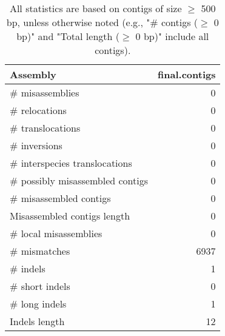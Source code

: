 \documentclass[12pt,a4paper]{article}
\begin{document}
\begin{table}[ht]
\begin{center}
\caption{All statistics are based on contigs of size $\geq$ 500 bp, unless otherwise noted (e.g., "\# contigs ($\geq$ 0 bp)" and "Total length ($\geq$ 0 bp)" include all contigs).}
\begin{tabular}{|l*{1}{|r}|}
\hline
Assembly & final.contigs \\ \hline
\# misassemblies & 0 \\ \hline
\hspace{5mm}\# relocations & 0 \\ \hline
\hspace{5mm}\# translocations & 0 \\ \hline
\hspace{5mm}\# inversions & 0 \\ \hline
\hspace{5mm}\# interspecies translocations & 0 \\ \hline
\# possibly misassembled contigs & 0 \\ \hline
\# misassembled contigs & 0 \\ \hline
Misassembled contigs length & 0 \\ \hline
\# local misassemblies & 0 \\ \hline
\# mismatches & 6937 \\ \hline
\# indels & 1 \\ \hline
\hspace{5mm}\# short indels & 0 \\ \hline
\hspace{5mm}\# long indels & 1 \\ \hline
Indels length & 12 \\ \hline
\end{tabular}
\end{center}
\end{table}
\end{document}
